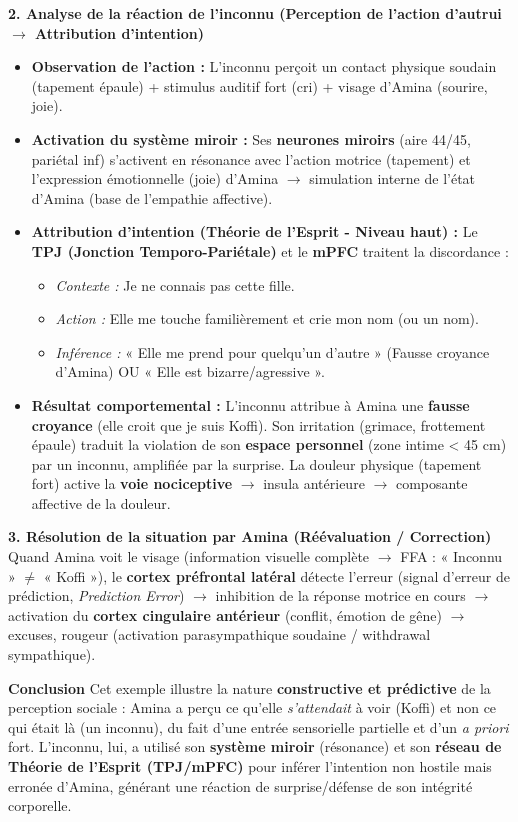 \documentclass[11pt]{article}
\begin{document}
\begin{exoresolu}
\textbf{2. Analyse de la réaction de l'inconnu (Perception de l'action d'autrui $\to$ Attribution d'intention)}
\begin{itemize}
    \item \textbf{Observation de l'action :} L'inconnu perçoit un contact physique soudain (tapement épaule) + stimulus auditif fort (cri) + visage d'Amina (sourire, joie).
    \item \textbf{Activation du système miroir :} Ses \textbf{neurones miroirs} (aire 44/45, pariétal inf) s'activent en résonance avec l'action motrice (tapement) et l'expression émotionnelle (joie) d'Amina $\to$ simulation interne de l'état d'Amina (base de l'empathie affective).
    \item \textbf{Attribution d'intention (Théorie de l'Esprit - Niveau haut) :} Le \textbf{TPJ (Jonction Temporo-Pariétale)} et le \textbf{mPFC} traitent la discordance :
    \begin{itemize}
        \item \textit{Contexte :} Je ne connais pas cette fille.
        \item \textit{Action :} Elle me touche familièrement et crie mon nom (ou un nom).
        \item \textit{Inférence :} « Elle me prend pour quelqu'un d'autre » (Fausse croyance d'Amina) OU « Elle est bizarre/agressive ».
    \end{itemize}
    \item \textbf{Résultat comportemental :} L'inconnu attribue à Amina une \textbf{fausse croyance} (elle croit que je suis Koffi). Son irritation (grimace, frottement épaule) traduit la violation de son \textbf{espace personnel} (zone intime < 45 cm) par un inconnu, amplifiée par la surprise. La douleur physique (tapement fort) active la \textbf{voie nociceptive} $\to$ insula antérieure $\to$ composante affective de la douleur.
\end{itemize}

\textbf{3. Résolution de la situation par Amina (Réévaluation / Correction)}
Quand Amina voit le visage (information visuelle complète $\to$ FFA : « Inconnu » $\neq$ « Koffi »), le \textbf{cortex préfrontal latéral} détecte l'erreur (signal d'erreur de prédiction, \emph{Prediction Error}) $\to$ inhibition de la réponse motrice en cours $\to$ activation du \textbf{cortex cingulaire antérieur} (conflit, émotion de gêne) $\to$ excuses, rougeur (activation parasympathique soudaine / withdrawal sympathique).

\textbf{Conclusion}
Cet exemple illustre la nature \textbf{constructive et prédictive} de la perception sociale : Amina a perçu ce qu'elle \emph{s'attendait} à voir (Koffi) et non ce qui était là (un inconnu), du fait d'une entrée sensorielle partielle et d'un \emph{a priori} fort. L'inconnu, lui, a utilisé son \textbf{système miroir} (résonance) et son \textbf{réseau de Théorie de l'Esprit (TPJ/mPFC)} pour inférer l'intention non hostile mais erronée d'Amina, générant une réaction de surprise/défense de son intégrité corporelle.
\end{exoresolu}
\end{document}
